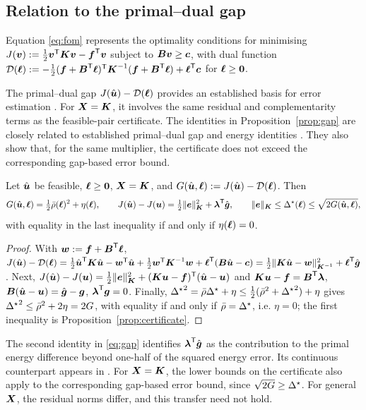 \subsection{Relation to the primal--dual gap}
Equation \eqref{eq:fom} represents the optimality conditions for minimising $J(\vv):=\frac12\vv\T\mK\vv-\vf\T\vv$ subject to $\mB\vv\ge\vc$, with
dual function $\mathcal D(\vell):=-\frac12(\vf+\mB\T\vell)\T\mK^{-1}(\vf+\mB\T\vell)+\vell\T\vc$ for $\vell\ge\boldsymbol 0$.

The primal--dual gap $J(\uh)-\mathcal D(\vell)$ provides an established basis for error estimation \cite{zhangs2020}. For $\mX=\mK$, it involves the same residual and complementarity terms
as the feasible-pair certificate. The identities in Proposition~\ref{prop:gap} are closely related to established primal--dual gap and energy identities \cite{bartels2025}. They also show that, for the same
multiplier, the certificate does not exceed the corresponding gap-based error bound.

\begin{proposition}\label{prop:gap}
Let $\uh$ be feasible, $\vell\ge\boldsymbol 0$, $\mX=\mK$, and $G(\uh,\vell):=J(\uh)-\mathcal D(\vell)$. Then
\begin{equation}\label{eq:gap}
  G(\uh,\vell)=\tfrac12\rhob(\vell)^2+\eta(\vell),\qquad
  J(\uh)-J(\vu)=\tfrac12\normK{\ve}^2+\vlam\T\gh,\qquad
  \normK{\ve}\le\Dstar(\vell)\le\sqrt{2G(\uh,\vell)},
\end{equation}
with equality in the last inequality if and only if $\eta(\vell)=0$.
\end{proposition}
\begin{proof}
With $\vw:=\vf+\mB\T\vell$, $J(\uh)-\mathcal D(\vell)=\frac12\uh\T\mK\uh-\vw\T\uh+\frac12\vw\T\mK^{-1}\vw+\vell\T(\mB\uh-\vc)=\frac12\normKi{\mK\uh-\vw}^2+\vell\T\gh$.
Next, $J(\uh)-J(\vu)=\frac12\normK{\ve}^2+(\mK\vu-\vf)\T(\uh-\vu)$ and $\mK\vu-\vf=\mB\T\vlam$, $\mB(\uh-\vu)=\gh-\vg$, $\vlam\T\vg=0$. Finally,
${\Dstar}^2=\rhob\Dstar+\eta\le\frac12(\rhob^2+{\Dstar}^2)+\eta$ gives ${\Dstar}^2\le\rhob^2+2\eta=2G$, with equality if and only if $\rhob=\Dstar$, i.e.
$\eta=0$; the first inequality is Proposition~\ref{prop:certificate}.
\end{proof}

The second identity in \eqref{eq:gap} identifies $\vlam\T\gh$ as the contribution to the primal energy difference beyond one-half of the squared
energy error. Its continuous counterpart appears in \cite{bartels2025}. For $\mX=\mK$, the lower bounds on the certificate also apply to the
corresponding gap-based error bound, since $\sqrt{2G}\ge\Dstar$. For general $\mX$, the residual norms differ, and this transfer need not hold.